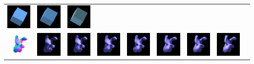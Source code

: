 \begin{center}
\begin{longtable}{@{}c@{}c@{}c@{}c@{}c@{}c@{}c@{}c@{}c@{}}
\includegraphics[width=0.1\linewidth]{training/5_5.png} & \includegraphics[width=0.1\linewidth]{training/5_6.png} &
\includegraphics[width=0.1\linewidth]{training/5_7.png} \\
\includegraphics[width=0.1\linewidth]{training/6_gt.png} & \includegraphics[width=0.1\linewidth]{training/6_0.png} &
\includegraphics[width=0.1\linewidth]{training/6_1.png} & \includegraphics[width=0.1\linewidth]{training/6_2.png} &
\includegraphics[width=0.1\linewidth]{training/6_3.png} & \includegraphics[width=0.1\linewidth]{training/6_4.png} &
\includegraphics[width=0.1\linewidth]{training/6_5.png} & \includegraphics[width=0.1\linewidth]{training/6_6.png} &

\end{longtable}
\end{center}
